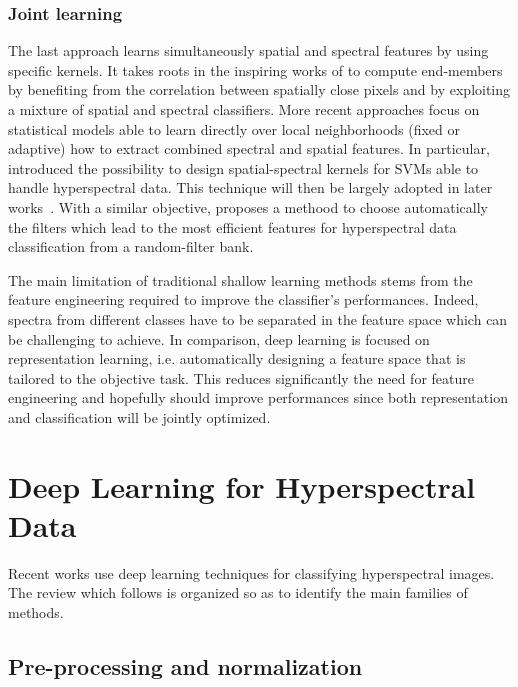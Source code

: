 \documentclass[journal]{IEEEtran}
\begin{document}
\subsubsection{Joint learning}

The last approach learns simultaneously spatial and spectral features by using specific kernels. It takes roots in the inspiring works of \cite{plaza_spatial/spectral_2002} to compute end-members by benefiting from the correlation between spatially close pixels and \cite{dellacqua_exploiting_2004} by exploiting a mixture of spatial and spectral classifiers. More recent approaches focus on statistical models able to learn directly over local neighborhoods (fixed or adaptive) how to extract combined spectral and spatial features. In particular, \cite{camps-valls_composite_2006} introduced the possibility to design spatial-spectral kernels for SVMs able to handle hyperspectral data. This technique will then be largely adopted in later works~\cite{tarabalka_spectralspatial_2009,fauvel_spatial-spectral_2012,cui_scalable_2017}. With a similar objective, \cite{tuia_multiclass_2015} proposes a methood to choose automatically the filters which lead to the most efficient features for hyperspectral data classification from a random-filter bank.




The main limitation of traditional shallow learning methods stems from the feature engineering required to improve the classifier's performances. Indeed, spectra from different classes have to be separated in the feature space which can be challenging to achieve. In comparison, deep learning is focused on representation learning, i.e. automatically designing a feature space that is tailored to the objective task. This reduces significantly the need for feature engineering and hopefully should improve performances since both representation and classification will be jointly optimized.


\section{Deep Learning for Hyperspectral Data}

Recent works use deep learning techniques for classifying hyperspectral images. The review which follows is organized so as to identify the main families of methods.

\subsection{Pre-processing and normalization}
\end{document}
